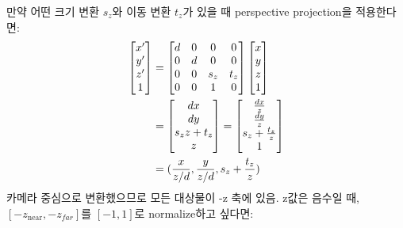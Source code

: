 만약 어떤 크기 변환 $s_z$와 이동 변환 $t_z$가 있을 때 perspective projection을 적용한다면:
$$
\begin{aligned}
  \begin{bmatrix}
    x^\prime \\
    y^\prime \\
    z^\prime \\
    1
  \end{bmatrix}
  &=
  \begin{bmatrix}
    d & 0 & 0 & 0 \\
    0 & d & 0 & 0 \\
    0 & 0 & s_z & t_z \\
    0 & 0 & 1 & 0
  \end{bmatrix}
  \begin{bmatrix}
    x \\
    y \\
    z \\
    1
  \end{bmatrix} \\
  &=
  \begin{bmatrix}
    dx \\
    dy \\
    s_zz + t_z \\
    z
  \end{bmatrix}
  =
  \begin{bmatrix}
    dx \over z \\
    dy \over z \\
    s_z + {t_z \over z} \\
    1
  \end{bmatrix} \\
  &= ({x \over z / d}, {y \over z / d}, s_z + {t_z \over z})
\end{aligned}
$$
카메라 중심으로 변환했으므로 모든 대상물이 -z 축에 있음. z값은 음수일 때, $[-z_\text{near}, -z_{far}]$를 $[-1, 1]$로 normalize하고 싶다면:

